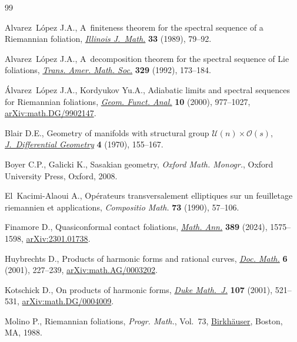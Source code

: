 \documentclass[10pt,a4paper]{amsart}
\numberwithin{equation}{section}
\theoremstyle{definition}
\begin{document}
\begin{thebibliography}{99}
\footnotesize\itemsep=0pt

Alvarez~L\'opez J.A., A~finiteness theorem for the spectral sequence of a
 {R}iemannian foliation,
 \href{https://doi.org/10.1215/ijm/1255988806}{\textit{Illinois J.~Math.}}
 \textbf{33} (1989), 79--92.

Alvarez~L\'opez J.A., A~decomposition theorem for the spectral sequence of
 {L}ie foliations, \href{https://doi.org/10.2307/2154083}{\textit{Trans. Amer.
 Math. Soc.}} \textbf{329} (1992), 173--184.

\'Alvarez~L\'opez J.A., Kordyukov Yu.A., Adiabatic limits and spectral sequences
 for {R}iemannian foliations,
 \href{https://doi.org/10.1007/PL00001653}{\textit{Geom. Funct. Anal.}}
 \textbf{10} (2000), 977--1027,
 \href{http://arxiv.org/abs/math.DG/9902147}{arXiv:math.DG/9902147}.

Blair D.E., Geometry of manifolds with structural group {$ \mathcal{U}(n)\times
 \mathcal{O}(s)$},
 \href{https://doi.org/10.4310/jdg/1214429380}{\textit{J.~Differential
 Geometry}} \textbf{4} (1970), 155--167.

Boyer C.P., Galicki K., Sasakian geometry, \textit{Oxford Math. Monogr.}, Oxford
 University Press, Oxford, 2008.

El~Kacimi-Alaoui A., Op\'erateurs transversalement elliptiques sur un
 feuilletage riemannien et applications, \textit{Compositio Math.} \textbf{73}
 (1990), 57--106.

Finamore D., Quasiconformal contact foliations,
 \href{https://doi.org/10.1007/s00208-023-02687-7}{\textit{Math. Ann.}}
 \textbf{389} (2024), 1575--1598,
 \href{http://arxiv.org/abs/2301.01738}{arXiv:2301.01738}.

Huybrechts D., Products of harmonic forms and rational curves,
 \href{https://doi.org/10.4171/DM/102}{\textit{Doc. Math.}} \textbf{6} (2001),
 227--239, \href{http://arxiv.org/abs/math.AG/0003202}{arXiv:math.AG/0003202}.

Kotschick D., On products of harmonic forms,
 \href{https://doi.org/10.1215/S0012-7094-01-10734-5}{\textit{Duke Math.~J.}}
 \textbf{107} (2001), 521--531,
 \href{http://arxiv.org/abs/math.DG/0004009}{arXiv:math.DG/0004009}.

Molino P., Riemannian foliations, \textit{Progr. Math.}, Vol.~73,
 \href{https://doi.org/10.1007/978-1-4684-8670-4}{Birkh\"auser}, Boston, MA,
 1988.


\end{thebibliography}
\end{document}
